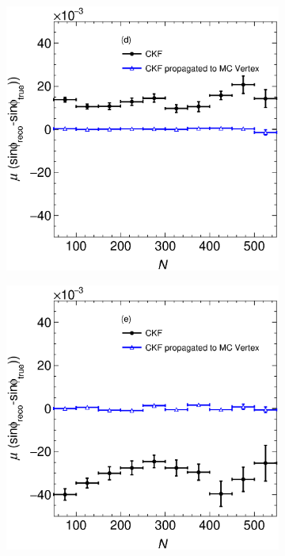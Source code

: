 \begin{figure}[t]
\begin{subfigure}{0.32\textwidth}
         \caption{} \label{fig:RessinphiVSNPoints_VertexComparison_2212}
     \end{subfigure}
          \begin{subfigure}{0.32\textwidth}
         \centering
        \includegraphics[width=\textwidth]{figures/ch6-TKI/sinphiRes/BiassinphiVSNPoints_VertexComparison_13.eps}
         \caption{} \label{fig:BiassinphiVSNPoints_VertexComparison_13}
     \end{subfigure}
     \begin{subfigure}{0.32\textwidth}
         \centering
        \includegraphics[width=\textwidth]{figures/ch6-TKI/sinphiRes/BiassinphiVSNPoints_VertexComparison_211.eps}

\end{subfigure}
\end{figure}
